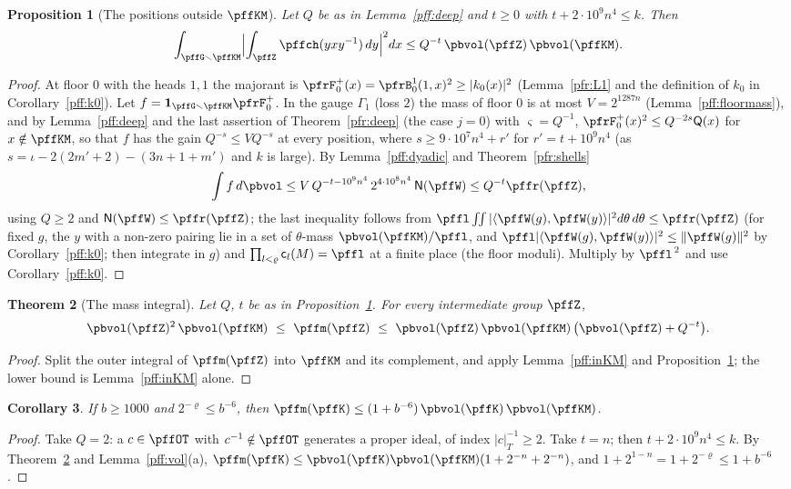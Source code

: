\documentclass[10pt]{amsart}
\newtheorem{theorem}{Theorem}[section]
\newtheorem{proposition}[theorem]{Proposition}
\newtheorem{corollary}[theorem]{Corollary}
\theoremstyle{definition}
\theoremstyle{remark}
\begin{document}
\begin{proposition}[The positions outside $\pffKM$]\label{pff:outside}
Let $Q$ be as in Lemma~\ref{pff:deep} and $t\ge0$ with $t+2\cdot10^9n^4\le k$. Then
\[
\int_{\pffG\smallsetminus\pffKM}\Bigl|\int_{\pffZ}\pffch(yxy^{-1})\,dy\Bigr|^2dx\le Q^{-t}\,\pbvol(
\pffZ)\,\pbvol(\pffKM).
\]
\end{proposition}
\begin{proof}
At floor $0$ with the heads $1,1$ the majorant is $\pfrF_0^+(x)=\pfrB^1_0(1,x)^2\ge|k_0(x)|^2$
(Lemma~\ref{pfr:L1} and the definition of $k_0$ in Corollary~\ref{pff:k0}). Let $f=\mathbf
1_{\pffG\smallsetminus\pffKM}\pfrF^+_0$. In the gauge $\Gamma_1$ (loss $2$) the mass of floor $0$ is at most
$V=2^{1287n}$ (Lemma~\ref{pff:floormass}), and by Lemma~\ref{pff:deep} and the last assertion of Theorem~\ref{pfr:deep}
(the case $j=0$) with $\varsigma=Q^{-1}$, $\pfrF^+_0(x)^2\le Q^{-2s}\mathsf Q(x)$ for $x\notin\pffKM$, so that $f$ has the
gain $Q^{-s}\le VQ^{-s}$ at every position, where $s\ge9\cdot10^7n^4+r'$ for $r'=t+10^9n^4$ (as $s=\iota-2(2m'+2)-
(3n+1+m')$ and $k$ is large). By Lemma~\ref{pff:dyadic} and Theorem~\ref{pfr:shells}
\[
\int f\,d\pbvol\le V\,Q^{-t-10^9n^4}\,2^{4\cdot10^8n^4}\,\mathsf N(\pffW)\le Q^{-t}\pffr(\pffZ),
\]
using $Q\ge2$ and $\mathsf N(\pffW)\le\pffr(\pffZ)$; the last inequality follows from
$\pffl\iint|\langle\pffW(g),\pffW(y)\rangle|^2d\theta\,d\theta\le\pffr(\pffZ)$ (for fixed $g$, the $y$
with a non-zero pairing lie in a set of $\theta$-mass $\pbvol(\pffKM)/\pffl$, and
$\pffl|\langle\pffW(g),\pffW(y)\rangle|^2\le\|\pffW(g)\|^2$ by Corollary~\ref{pff:k0}; then integrate in $g$)
and $\prod_{l<\varrho}\mathsf c_l(M)=\pffl$ at a finite place (the floor moduli). Multiply by
$\pffl^{\,2}$ and use Corollary~\ref{pff:k0}.
\end{proof}

\begin{theorem}[The mass integral]\label{pff:massZ}
Let $Q$, $t$ be as in Proposition~\ref{pff:outside}. For every intermediate group $\pffZ$,
\[
\pbvol(\pffZ)^2\,\pbvol(\pffKM)\ \le\ \pffm(\pffZ)\ \le\ \pbvol(\pffZ)\,\pbvol(\pffKM)\,\bigl(\pbvol(
\pffZ)+Q^{-t}\bigr).
\]
\end{theorem}
\begin{proof}
Split the outer integral of $\pffm(\pffZ)$ into $\pffKM$ and its complement, and apply
Lemma~\ref{pff:inKM} and Proposition~\ref{pff:outside}; the lower bound is Lemma~\ref{pff:inKM}
alone.
\end{proof}

\begin{corollary}\label{pff:massK}
If $b\ge1000$ and $2^{-\varrho}\le b^{-6}$, then $\pffm(\pffK)\le(1+b^{-6})\,\pbvol(\pffK)\,
\pbvol(\pffKM)$.
\end{corollary}
\begin{proof}
Take $Q=2$: a $c\in\pffOT$ with $c^{-1}\notin\pffOT$ generates a proper ideal, of index
$|c|_T^{-1}\ge2$. Take $t=n$; then $t+2\cdot10^9n^4\le k$. By Theorem~\ref{pff:massZ} and
Lemma~\ref{pff:vol}(a), $\pffm(\pffK)\le\pbvol(\pffK)\pbvol(\pffKM)(1+2^{-n}+2^{-n})$, and
$1+2^{1-n}=1+2^{-\varrho}\le1+b^{-6}$.
\end{proof}
\end{document}

